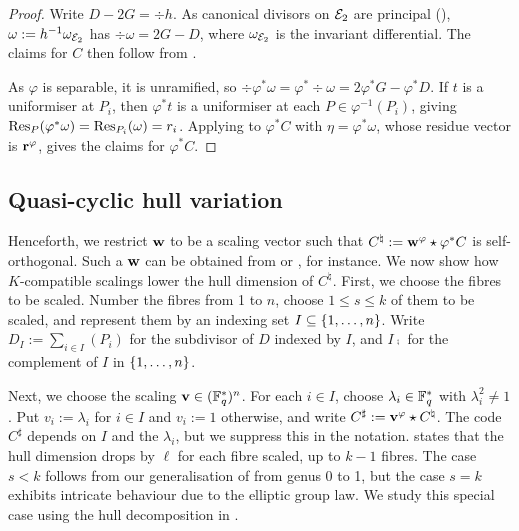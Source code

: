 \documentclass[twocolumn, 11pt]{scrartcl}
\begin{document}
\begin{proof}
    Write $D-2G=\div h$. As canonical divisors on $\mathcal{E}_2$ are principal (), $\omega:=h^{-1}\omega_{\mathcal{E}_2}$ has $\div\omega=2G-D$, where $\omega_{\mathcal{E}_2}$ is the invariant differential. The claims for $C$ then follow from .

    As $\varphi$ is separable, it is unramified, so $\div\varphi^*\omega=\varphi^*\div\omega=2\varphi^*G-\varphi^*D$. If $t$ is a uniformiser at $P_i$, then $\varphi^*t$ is a uniformiser at each $P\in\varphi^{-1}(P_i)$, giving $\operatorname{Res}_P(\varphi^*\omega)=\operatorname{Res}_{P_i}(\omega)=r_i$. Applying  to $\varphi^*C$ with $\eta=\varphi^*\omega$, whose residue vector is $\mathbf{r}^\varphi$, gives the claims for $\varphi^*C$.
\end{proof}

\subsection{Quasi-cyclic hull variation} \label{subsection:qc-hv}

Henceforth, we restrict $\mathbf{w}$ to be a scaling vector such that $C^\natural:=\mathbf{w}^\varphi\star\varphi^*C$ is self-orthogonal. Such a $\mathbf{w}$ can be obtained from  or , for instance. We now show how $K$-compatible scalings lower the hull dimension of $C^\natural$. First, we choose the fibres to be scaled. Number the fibres from 1 to $n$, choose $1\leq s\leq k$ of them to be scaled, and represent them by an indexing set $I\subseteq\{1,\hdots,n\}$. Write $D_I:=\sum_{i\in I}(P_i)$ for the subdivisor of $D$ indexed by $I$, and $I\comp$ for the complement of $I$ in $\{1,\hdots,n\}$.

Next, we choose the scaling $\mathbf{v}\in(\mathbb{F}_q^*)^n$. For each $i\in I$, choose $\lambda_i\in\mathbb{F}_q^*$ with $\lambda_i^2\neq1$. Put $v_i:=\lambda_i$ for $i\in I$ and $v_i:=1$ otherwise, and write $C^\sharp:=\mathbf{v}^\varphi\star C^\natural$.
The code $C^\sharp$ depends on $I$ and the $\lambda_i$, but we suppress this in the notation.  states that the hull dimension drops by $\ell$ for each fibre scaled, up to $k-1$ fibres. The case $s<k$ follows from our generalisation of \cite[Thm.~1(i)]{fang2020euclidean} from genus 0 to 1, but the case $s=k$ exhibits intricate behaviour due to the elliptic group law. We study this special case using the hull decomposition in .
\end{document}
